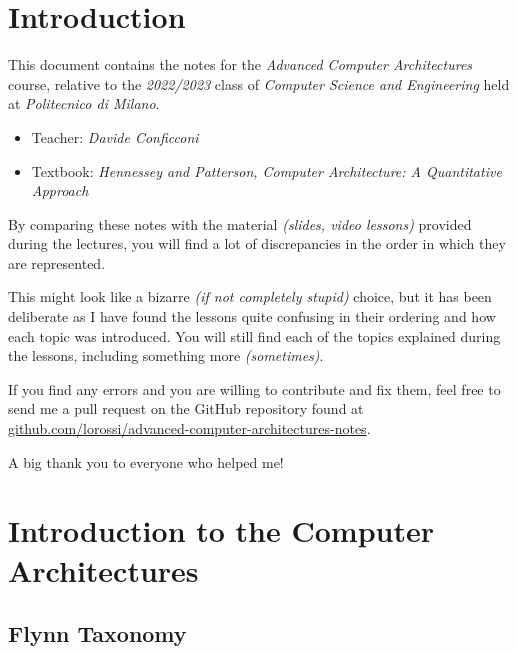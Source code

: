 \documentclass[english]{article}
\begin{document}
\makecover

\section*{Introduction}

This document contains the notes for the \textit{Advanced Computer Architectures} course, relative to the \textit{2022/2023} class of \textit{Computer Science and Engineering} held at \textit{Politecnico di Milano}.

\bigskip

\begin{itemize}
  \item Teacher: \textit{Davide Conficconi}
  \item Textbook: \textit{Hennessey and Patterson, Computer Architecture: A Quantitative Approach}
\end{itemize}

\bigskip

By comparing these notes with the material \textit{(slides, video lessons)} provided during the lectures, you will find a lot of discrepancies in the order in which they are represented.

This might look like a bizarre \textit{(if not completely stupid)} choice, but it has been deliberate as I have found the lessons quite confusing in their ordering and how each topic was introduced.
You will still find each of the topics explained during the lessons, including something more \textit{(sometimes)}.

\bigskip

If you find any errors and you are willing to contribute and fix them, feel free to send me a pull request on the GitHub repository found at \href{https://github.com/lorossi/advanced-computer-architectures-notes}{github.com/lorossi/advanced-computer-architectures-notes}.

\bigskip

A big thank you to everyone who helped me!

\clearpage

\section{Introduction to the Computer Architectures}

\subsection{Flynn Taxonomy}
\label{sec:flynn-taxonomy}
\end{document}
